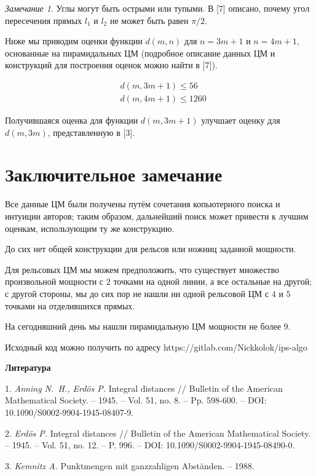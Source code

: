 \documentclass[12pt]{article}
\theoremstyle{theorem}
\theoremstyle{dfn}
\theoremstyle{remark}
\newtheorem{remark}{Замечание}
\begin{document}
\begin{remark}
Углы могут быть острыми или тупыми. В [7] описано, почему угол пересечения прямых $l_{1}$ и $l_{2}$ не может быть равен ${\pi}/2$.
\end{remark}

Ниже мы приводим оценки функции $d(m, n)$ для $n = 3m + 1$ и $n = 4m + 1$, основанные на пирамидальных ЦМ (подробное описание данных ЦМ и конструкций для построения оценок можно найти в [7]).

\begin{align}
&d(m, 3m + 1) \leq 56 \label{result2} \\
&d(m, 4m + 1) \leq 1260 \label{result3}
\end{align}

Получившаяся оценка для функции $d(m, 3m + 1)$ улучшает оценку для $d(m, 3m)$, представленную в [3].

\section{Заключительное замечание}

Все данные ЦМ были получены путём сочетания копьютерного поиска и интуиции авторов;
таким образом, дальнейший поиск может привести к лучшим оценкам, использующим ту же
конструкцию.

До сих нет общей конструкции для рельсов или ножниц заданной мощности.

Для рельсовых ЦМ мы можем предположить, что существует множество произвольной мощности с $2$ точками на одной линии, а все остальные на другой; с другой стороны,
мы до сих пор не нашли ни одной рельсовой ЦМ с $4$ и $5$ точками на отделившихся прямых.

На сегодняшний день мы нашли пирамидальную ЦМ мощности не более $9$.

Исходный код можно получить по адресу https://gitlab.com/Nickkolok/ips-algo

\bigskip\centerline{\bf Литература}

1.	\emph{ Anning N.~H., Erd{\"o}s P.} Integral distances // Bulletin of the American Mathematical Society. -- 1945. -- Vol. 51, no. 8. -- Pp. 598-600. -- DOI: 10.1090/S0002-9904-1945-08407-9.

2.	\emph{ Erd{\"o}s P.} Integral distances // Bulletin of the American Mathematical Society. -- 1945. -- Vol. 51, no. 12. -- P. 996. -- DOI: 10.1090/S0002-9904-1945-08490-0.

3.  \emph{ Kemnitz A.} Punktmengen mit ganzzahligen Abst{\"a}nden. -- 1988.
\end{document}
